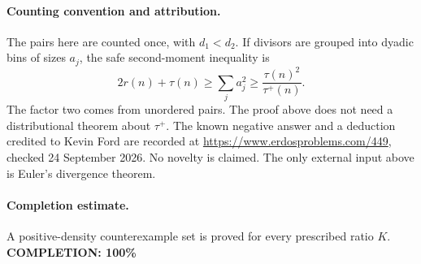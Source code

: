 \paragraph{Counting convention and attribution.}
The pairs here are counted once, with \(d_1<d_2\).
If divisors are grouped into dyadic bins of sizes \(a_j\), the safe
second-moment inequality is
\[
 2r(n)+\tau(n)\geq\sum_j a_j^2
 \geq\frac{\tau(n)^2}{\tau^+(n)}.
\]
The factor two comes from unordered pairs. The proof above does not
need a distributional theorem about \(\tau^+\).
The known negative answer and a deduction credited to Kevin Ford are
recorded at \url{https://www.erdosproblems.com/449},
checked 24 September 2026. No novelty is claimed.
The only external input above is Euler's divergence theorem.

\paragraph{Completion estimate.}
A positive-density counterexample set is proved for every prescribed ratio \(K\).
\textbf{COMPLETION: 100\%}
